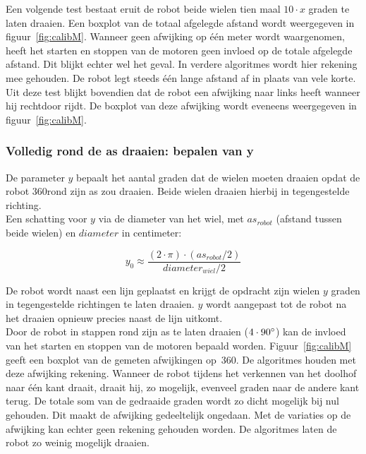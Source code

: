 \documentclass[tt3]{penoverslag}
\begin{document}
Een volgende test bestaat eruit de robot beide wielen tien maal $10 \cdot x$ graden te laten draaien. Een boxplot van de totaal afgelegde afstand wordt weergegeven in figuur~\ref{fig:calibM}. Wanneer geen afwijking op \'e\'en meter wordt waargenomen, heeft het starten en stoppen van de motoren geen invloed op de totale afgelegde afstand. Dit blijkt echter wel het geval. In verdere algoritmes wordt hier rekening mee gehouden. De robot legt steeds \'e\'en lange afstand af in plaats van vele korte.\\
Uit deze test blijkt bovendien dat de robot een afwijking naar links heeft wanneer hij rechtdoor rijdt. De boxplot van deze afwijking wordt eveneens weergegeven in figuur~\ref{fig:calibM}.


\subsubsection{Volledig rond de as draaien: bepalen van y} %
\label{ssec:calibMy}
De parameter $y$ bepaalt het aantal graden dat de wielen moeten draaien opdat de robot 360\degree rond zijn as zou draaien. Beide wielen draaien hierbij in tegengestelde richting.\\
Een schatting voor $y$ via de diameter van het wiel, met $as_{robot}$ (afstand tussen beide wielen) en $diameter$ in centimeter:

\begin{equation*}
y_{0} \approx \frac{(2 \cdot \pi) \cdot (as_{robot}/2)}{diameter_{wiel}/2}
\end{equation*}

De robot wordt naast een lijn geplaatst en krijgt de opdracht zijn wielen $y$ graden in tegengestelde richtingen te laten draaien. $y$ wordt aangepast tot de robot na het draaien opnieuw precies naast de lijn uitkomt.\\


Door de robot in stappen rond zijn as te laten draaien ($4 \cdot 90\degree$) kan de invloed van het starten en stoppen van de motoren bepaald worden. Figuur~\ref{fig:calibM} geeft een boxplot van de gemeten afwijkingen op~360\degree. De algoritmes houden met deze afwijking rekening. Wanneer de robot tijdens het verkennen van het doolhof naar \'e\'en kant draait, draait hij, zo mogelijk, evenveel graden naar de andere kant terug. De totale som van de gedraaide graden wordt zo dicht mogelijk bij nul gehouden. Dit maakt de afwijking gedeeltelijk ongedaan. Met de variaties op de afwijking kan echter geen rekening gehouden worden. De algoritmes laten de robot zo weinig mogelijk draaien.
\end{document}
